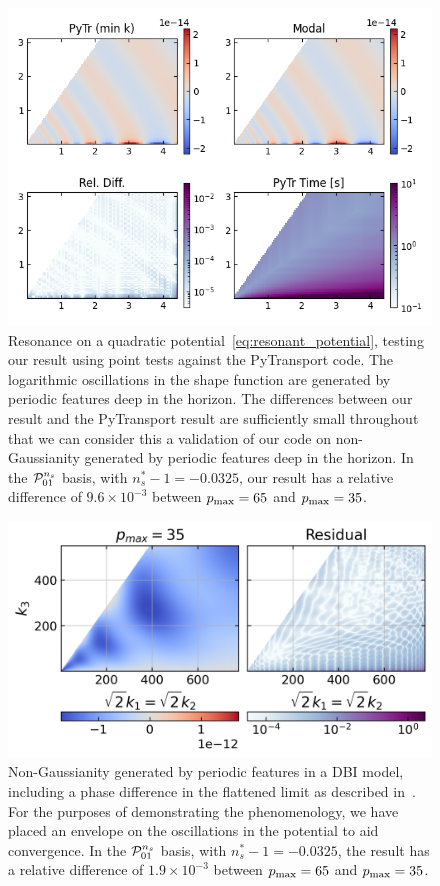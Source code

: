 \begin{figure}[!pth]
\centering
\includegraphics[width=0.99\columnwidth]{plots/slice_min_100.png}
\caption{
    Resonance on a quadratic potential~\eqref{eq:resonant_potential},
    testing our result using point tests against the
    PyTransport code.
    The logarithmic oscillations in the shape function are generated by periodic
    features deep in the horizon.
    The differences between our result and the PyTransport result
    are sufficiently small throughout that we can consider this
    a validation of our code on non-Gaussianity generated by periodic
    features deep in the horizon.
    In the $\mathcal{P}^{n_s}_{01}$ basis, with $n_s^{*}-1 = -0.0325$,
    our result has a relative difference of $9.6\times10^{-3}$
    between $p_\text{max}=65$ and $p_\text{max}=35$.
}\label{pytr_comparison_min}
\end{figure}

\begin{figure}[!pth]
\centering
\includegraphics[width=0.99\columnwidth]{plots/tetra_slice_dbi_reso_bump_hq_coolwarm.png}
\caption{
    Non-Gaussianity generated by periodic
    features in a DBI model, including a phase difference
    in the flattened limit as described in~\cite{chen_folded_resonant}.
    For the purposes of demonstrating the phenomenology,
    we have placed an envelope on the oscillations in the potential
    to aid convergence.
    In the $\mathcal{P}^{n_s}_{01}$ basis, with $n_s^{*}-1 = -0.0325$,
    the result has a relative difference of $1.9\times10^{-3}$
    between $p_\text{max}=65$ and $p_\text{max}=35$.
}\label{slice_plot_dbi_reso}
\end{figure}
